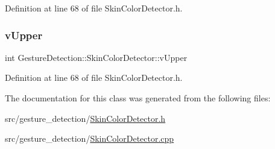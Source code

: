 Definition at line 68 of file Skin\+Color\+Detector.\+h.

\mbox{\label{class_gesture_detection_1_1_skin_color_detector_a82c6256414d9c3cb968d6f0de12fc7d9}} 
\subsubsection{\texorpdfstring{v\+Upper}{vUpper}}
{\footnotesize\ttfamily int Gesture\+Detection\+::\+Skin\+Color\+Detector\+::v\+Upper\hspace{0.3cm}{\ttfamily [private]}}



Definition at line 68 of file Skin\+Color\+Detector.\+h.



The documentation for this class was generated from the following files\+:\begin{DoxyCompactItemize}
\item 
src/gesture\+\_\+detection/\hyperlink{_skin_color_detector_8h}{Skin\+Color\+Detector.\+h}\item 
src/gesture\+\_\+detection/\hyperlink{_skin_color_detector_8cpp}{Skin\+Color\+Detector.\+cpp}\end{DoxyCompactItemize}
